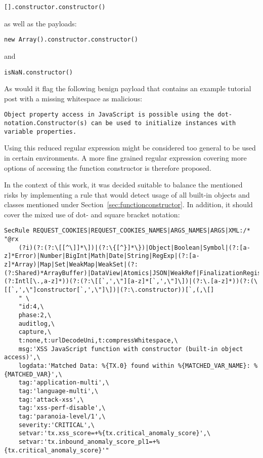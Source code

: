 \begin{lstlisting}[style=basicStyle]
[].constructor.constructor()
\end{lstlisting}

as well as the payloads:

\begin{lstlisting}[style=basicStyle]
new Array().constructor.constructor()
\end{lstlisting}

and

\begin{lstlisting}[style=basicStyle]
isNaN.constructor()
\end{lstlisting}

As would it flag the following benign payload that contains an example tutorial post with a missing whitespace as malicious:

\begin{lstlisting}[style=basicStyle]
Object property access in JavaScript is possible using the dot-notation.Constructor(s) can be used to initialize instances with variable properties.
\end{lstlisting}

Using this reduced regular expression might be considered too general to be used in certain environments. A more fine grained regular expression covering more options of accessing the function constructor is therefore proposed. 

In the context of this work, it was decided suitable to balance the mentioned risks by implementing a rule that would detect usage of all built-in objects and classes mentioned under Section~\ref{sec:functionconstructor}. In addition, it should cover the mixed use of dot- and square bracket notation: 

\begin{lstlisting}[style=basicStyle, caption=rule proposal to block usage of function constructor via built-in objects, label={lst:constructorsruleproposal3}]
SecRule REQUEST_COOKIES|REQUEST_COOKIES_NAMES|ARGS_NAMES|ARGS|XML:/* "@rx 
    (?i)(?:(?:\[[^\]]*\])|(?:\{[^}]*\})|Object|Boolean|Symbol|(?:[a-z]*Error)|Number|BigInt|Math|Date|String|RegExp|(?:[a-z]*Array)|Map|Set|WeakMap|WeakSet|(?:(?:Shared)*ArrayBuffer)|DataView|Atomics|JSON|WeakRef|FinalizationRegistry|Iterator|AsyncIterator|Promise|GeneratorFunction|AsyncGeneratorFunction|Generator|AsyncGenerator|AsyncFunction|Reflect|Proxy|(?:Intl[\.,a-z]*))(?:(?:\[[`,',\"][a-z]*[`,',\"]\])|(?:\.[a-z]*))(?:(\[[`,',\"]constructor[`,',\"]\])|(?:\.constructor))[`,(,\[] 
    " \
    "id:4,\
    phase:2,\
    auditlog,\
    capture,\
    t:none,t:urlDecodeUni,t:compressWhitespace,\
    msg:'XSS JavaScript function with constructor (built-in object access)',\
    logdata:'Matched Data: %{TX.0} found within %{MATCHED_VAR_NAME}: %{MATCHED_VAR}',\
    tag:'application-multi',\
    tag:'language-multi',\
    tag:'attack-xss',\
    tag:'xss-perf-disable',\
    tag:'paranoia-level/1',\
    severity:'CRITICAL',\
    setvar:'tx.xss_score=+%{tx.critical_anomaly_score}',\
    setvar:'tx.inbound_anomaly_score_pl1=+%{tx.critical_anomaly_score}'"
\end{lstlisting}

